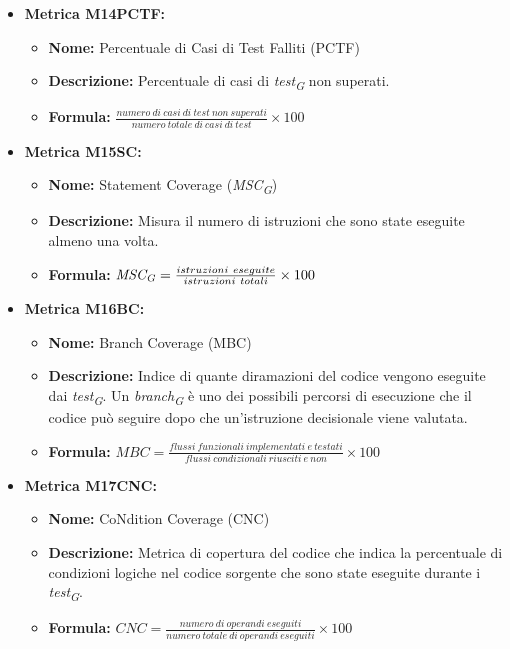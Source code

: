 \begin{itemize}
    \item \textbf{Metrica M14PCTF:}
          \begin{itemize}
           \item \textbf{Nome:} Percentuale di Casi di Test Falliti (PCTF)
           \item \textbf{Descrizione:} Percentuale di casi di \textit{test}\textsubscript{\textit{G}} non superati.
           \item \textbf{Formula:} $\frac{numero \ di \ casi \ di \ test \ non \ superati}{numero \ totale \ di \ casi \ di \ test}\times 100$
          \end{itemize}

          \item \textbf{Metrica M15SC:}
          \begin{itemize}
              \item \textbf{Nome:} Statement Coverage (\textit{MSC}\textsubscript{\textit{G}})
              \item \textbf{Descrizione:} Misura il numero di istruzioni che sono state eseguite almeno una volta.
              \item \textbf{Formula:} $\textit{MSC}\textsubscript{\textit{G}} = \frac{istruzioni \ eseguite}{istruzioni \ totali} \times 100$
          \end{itemize}

          \item \textbf{Metrica M16BC:}
          \begin{itemize}
              \item \textbf{Nome:} Branch Coverage (MBC)
              \item \textbf{Descrizione:} Indice di quante diramazioni del codice vengono eseguite dai \textit{test}\textsubscript{\textit{G}}. Un \textit{branch}\textsubscript{\textit{G}} è uno dei possibili percorsi di esecuzione che il codice può seguire dopo che un'istruzione decisionale viene valutata.
              \item \textbf{Formula:} $MBC = \frac{flussi \ funzionali \ implementati \ e \ testati}{flussi \ condizionali \ riusciti \ e \ non} \times 100$
          \end{itemize}

          \item \textbf{Metrica M17CNC:}
          \begin{itemize}
              \item \textbf{Nome:} CoNdition Coverage (CNC)
              \item \textbf{Descrizione:} Metrica di copertura del codice che indica la percentuale di condizioni logiche nel codice sorgente che sono state eseguite durante i \textit{test}\textsubscript{\textit{G}}.
              \item \textbf{Formula:} $CNC = \frac{numero \ di \ operandi \ eseguiti}{numero \ totale \ di \ operandi \ eseguiti} \times 100$
          \end{itemize}
\end{itemize}